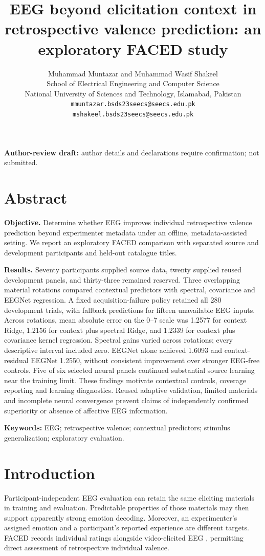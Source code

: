 \documentclass[11pt,a4paper]{article}
\title{EEG beyond elicitation context in retrospective valence prediction: an exploratory FACED study}
\author{Muhammad Muntazar and Muhammad Wasif Shakeel\\
\small School of Electrical Engineering and Computer Science\\
\small National University of Sciences and Technology, Islamabad, Pakistan\\
\small \texttt{mmuntazar.bsds23seecs@seecs.edu.pk}\\
\small \texttt{mshakeel.bsds23seecs@seecs.edu.pk}}
\date{}
\begin{document}
\doublespacing
\linenumbers
\maketitle
\begin{center}
\small\textbf{Author-review draft:} author details and declarations require confirmation; not submitted.
\end{center}

\section*{Abstract}
\textbf{Objective.} Determine whether EEG improves individual retrospective valence prediction beyond experimenter metadata under an offline, metadata-assisted setting. We report an exploratory FACED comparison with separated source and development participants and held-out catalogue titles.

\textbf{Results.} Seventy participants supplied source data, twenty supplied reused development panels, and thirty-three remained reserved. Three overlapping material rotations compared contextual predictors with spectral, covariance and EEGNet regression. A fixed acquisition-failure policy retained all 280 development trials, with fallback predictions for fifteen unavailable EEG inputs. Across rotations, mean absolute error on the 0--7 scale was 1.2577 for context Ridge, 1.2156 for context plus spectral Ridge, and 1.2339 for context plus covariance kernel regression. Spectral gains varied across rotations; every descriptive interval included zero. EEGNet alone achieved 1.6093 and context-residual EEGNet 1.2550, without consistent improvement over stronger EEG-free controls. Five of six selected neural panels continued substantial source learning near the training limit. These findings motivate contextual controls, coverage reporting and learning diagnostics. Reused adaptive validation, limited materials and incomplete neural convergence prevent claims of independently confirmed superiority or absence of affective EEG information.

\noindent\textbf{Keywords:} EEG; retrospective valence; contextual predictors; stimulus generalization; exploratory evaluation.

\section*{Introduction}
Participant-independent EEG evaluation can retain the same eliciting materials in training and evaluation. Predictable properties of those materials may then support apparently strong emotion decoding. Moreover, an experimenter's assigned emotion and a participant's reported experience are different targets. FACED records individual ratings alongside video-elicited EEG \cite{chen2023faced}, permitting direct assessment of retrospective individual valence.
\end{document}
